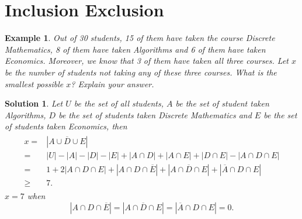 \documentclass{../../cls/sig-alternate-05-2015}
\newtheorem{example}{Example}
\newtheorem*{solution*}{Solution}
\begin{document}
\section{Inclusion Exclusion}
\begin{example}
    Out of 30 students, 15 of them have taken the course Discrete Mathematics, 8 of them have taken Algorithms and 6 of them have taken Economics. Moreover, we know that 3 of them have taken all three courses. Let $x$ be the number of students not taking any of these three courses. What is the smallest possible $x$? Explain your answer.
\end{example}
\begin{solution*}
    Let $U$ be the set of all students, $A$ be the set of student taken Algorithms, $D$ be the set of students taken Discrete Mathematics and $E$ be the set of students taken Economics, then \begin{align}
        \begin{aligned}
        x = & \left|\overline{A \cup D \cup E}\right|\\
        = & \left|U\right| - \left|A\right| - \left|D\right| - \left|E\right| + \left|A \cap D\right| + \left|A \cap E\right| + \left|D \cap E\right| - \left|A \cap D \cap E\right|\\
        = & 1 + 2 \left|A \cap D \cap E\right| + \left|A \cap D \cap \overline{E}\right| + \left|A \cap \overline{D} \cap E\right| + \left|\overline{A} \cap D \cap E\right|\\
        \ge & 7.
        \end{aligned}
    \end{align} $x = 7$ when \begin{equation}
        \left|A \cap D \cap \overline{E}\right| = \left|A \cap \overline{D} \cap E\right| = \left|\overline{A} \cap D \cap E\right| = 0.
    \end{equation}
\end{solution*}
\end{document}
